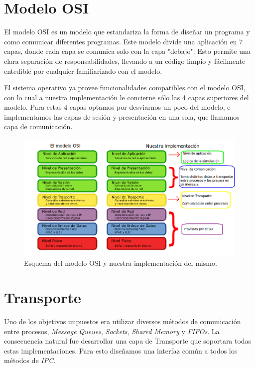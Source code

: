 \documentclass[a4paper,10pt]{article}
\begin{document}
\newpage
\section{Modelo OSI}

El modelo OSI es un modelo que estandariza la forma de diseñar un programa y como comunicar diferentes programas. 
Este modelo divide una aplicación en 7 capas, donde cada capa se comunica solo con la capa "debajo".
Esto permite una clara separación de responsabilidades, llevando a un código limpio y fácilmente entedible por cualquier familiarizado con el modelo.

El sistema operativo ya provee funcionalidades compatibles con el modelo OSI, con lo cual a nuestra implementación le concierne sólo las 4 capas superiores del modelo.
Para estas 4 capas optamos por desviarnos un poco del modelo, e implementamos las capas de sesión y presentación en una sola, que llamamos capa de comunicación.

\begin{figure}[H]
\begin{center}
 \includegraphics[scale=0.5]{./images/modelo-osi_nuestro.png}
 \caption{Esquema del modelo OSI y nuestra implementación del mismo.}
\end{center}
\end{figure}


\newpage
\section{Transporte}
Uno de los objetivos impuestos era utilizar diversos métodos de comunicación entre procesos, \textit{Message Queues}, \textit{Sockets}, \textit{Shared Memory} y
\textit{FIFOs}.
La consecuencia natural fue desarrollar una capa de Transporte que soportara todas estas implementaciones.
Para esto diseñamos una interfaz común a todos los métodos de \textit{IPC}.
\end{document}
